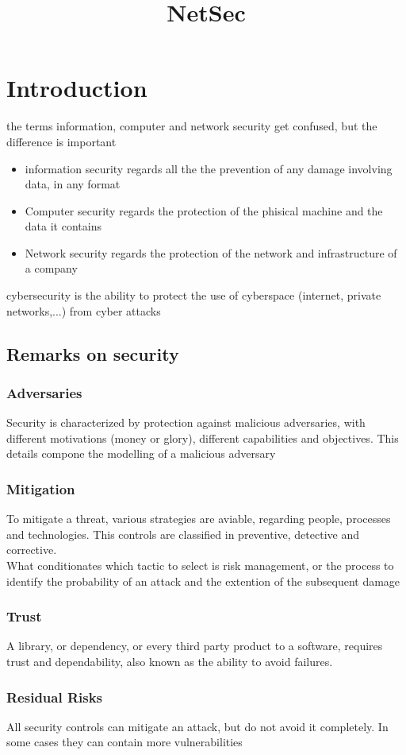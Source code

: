 \documentclass[12pt, a4paper]{article}
\title{NetSec}
\begin{document}
\section{Introduction}
the terms information, computer and network security get confused, but the difference is important
\begin{itemize}
    \item information security regards all the the prevention of any damage involving data, in any format
    \item Computer security regards the protection of the phisical machine and the data it contains
    \item Network security regards the protection of the network and infrastructure of a company
\end{itemize}
cybersecurity is the ability to protect the use of cyberspace (internet, private networks,...) from cyber
attacks

\subsection{Remarks on security}
\subsubsection*{Adversaries}
Security is characterized by protection against malicious adversaries, with different motivations (money
or glory), different capabilities and objectives. This details compone the modelling of a malicious 
adversary

\subsubsection*{Mitigation}
To mitigate a threat, various strategies are aviable, regarding people, processes and technologies.
This controls are classified in preventive, detective and corrective.\\What conditionates which tactic 
to select is risk management, or the process to identify the probability of an attack and the extention 
of the subsequent damage

\subsubsection*{Trust}
A library, or dependency, or every third party product to a software, requires trust and dependability,
also known as the ability to avoid failures.

\subsubsection*{Residual Risks}
All security controls can mitigate an attack, but do not avoid it completely. In some cases they can contain more vulnerabilities
\end{document}
